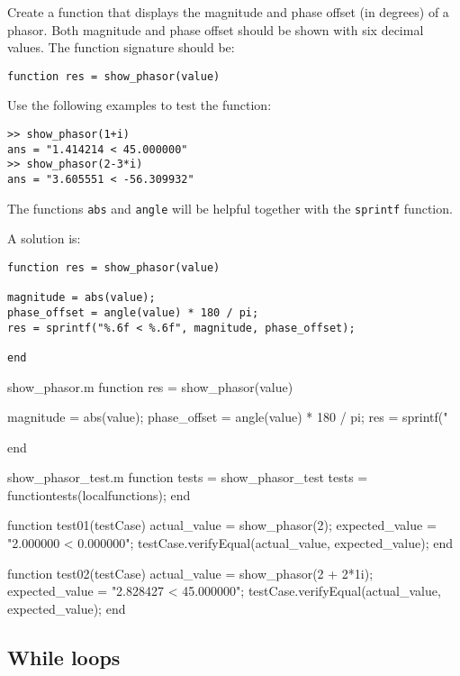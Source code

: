 \begin{ex}
Create a function that displays the magnitude and 
phase offset (in degrees) of a phasor.
Both magnitude and phase offset should be shown with six 
decimal values.
The function signature should be:
\begin{lstlisting}
function res = show_phasor(value)
\end{lstlisting}
Use the following examples to test the function:
\begin{lstlisting}
>> show_phasor(1+i)
ans = "1.414214 < 45.000000"
>> show_phasor(2-3*i)
ans = "3.605551 < -56.309932"
\end{lstlisting}
\begin{hint}
The functions \verb!abs! and \verb!angle! will be helpful together with the \verb!sprintf! function.
\end{hint}
\begin{sol}
A solution is:
\begin{lstlisting}
function res = show_phasor(value)

magnitude = abs(value);
phase_offset = angle(value) * 180 / pi;
res = sprintf("%.6f < %.6f", magnitude, phase_offset);

end
\end{lstlisting}
\end{sol}
\begin{solutionfile}{show_phasor.m}
function res = show_phasor(value)

magnitude = abs(value);
phase_offset = angle(value) * 180 / pi;
res = sprintf("%

end
\end{solutionfile}
\begin{solutionfile}{show_phasor_test.m}
function tests = show_phasor_test
    tests = functiontests(localfunctions);
end


function test01(testCase)
    actual_value = show_phasor(2);
    expected_value = "2.000000 < 0.000000";
    testCase.verifyEqual(actual_value, expected_value);
end

function test02(testCase)
    actual_value = show_phasor(2 + 2*1i);
    expected_value = "2.828427 < 45.000000";
    testCase.verifyEqual(actual_value, expected_value);
end
\end{solutionfile}
\end{ex}



\subsection{While loops}

